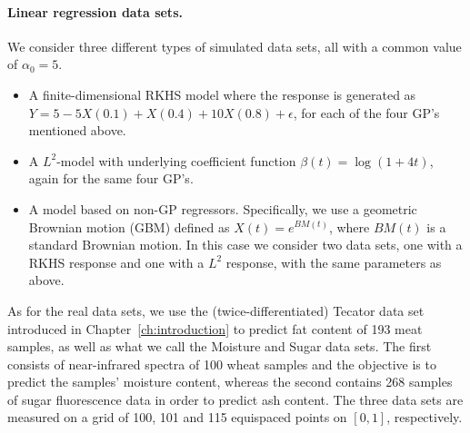 \paragraph{Linear regression data sets.} We consider three different types of simulated data sets, all with a common value of \(\alpha_0=5\).
\begin{itemize}
  \item A finite-dimensional RKHS model where the response is generated as \(Y=5 -5X(0.1) + X(0.4) + 10X(0.8) + \epsilon\), for each of the four GP's mentioned above.
  \item A \(L^2\)-model with underlying coefficient function \(\beta(t)=\log(1+4t)\), again for the same four GP's.
  \item A model based on non-GP regressors. Specifically, we use a geometric Brownian motion (GBM) defined as \(X(t)=e^{BM(t)}\), where \(BM(t)\) is a standard Brownian motion. In this case we consider two data sets, one with a RKHS response and one with a \(L^2\) response, with the same parameters as above.
\end{itemize}
As for the real data sets, we use the (twice-differentiated) Tecator data set introduced in Chapter~\ref{ch:introduction} to predict fat content of 193 meat samples, as well as what we call the Moisture \citep{kalivas1997two} and Sugar \citep{bro1999exploratory} data sets. The first consists of near-infrared spectra of 100 wheat samples and the objective is to predict the samples' moisture content, whereas the second contains 268 samples of sugar fluorescence data in order to predict ash content. The three data sets are measured on a grid of 100, 101 and 115 equispaced points on \([0, 1]\), respectively.

